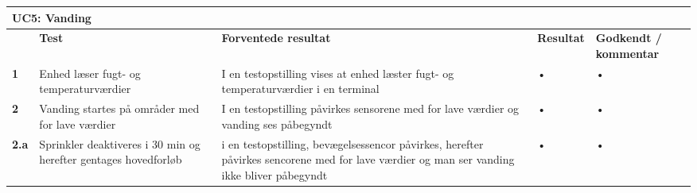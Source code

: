 
\begin{longtable}{|p{5mm}|p{40mm}|p{40mm}|p{20mm}|p{25mm}|}
\hline 
\multicolumn{5}{|l|}{\textbf{UC5: Vanding}} \\ 
\hline 
& \textbf{Test} & \textbf{Forventede resultat} & \textbf{Resultat} & \textbf{Godkendt / kommentar} \\ 
\hline 
\textbf{1}& Enhed læser fugt- og temperaturværdier & I en testopstilling vises at enhed læster fugt- og temperaturværdier i en terminal & • & • \\ 
\hline 
\textbf{2}& Vanding startes på områder med for lave værdier & I en testopstilling påvirkes sensorene med for lave værdier og vanding ses påbegyndt & • & • \\ 
\hline 
\textbf{2.a}& Sprinkler deaktiveres i 30 min og herefter gentages hovedforløb & i en testopstilling, bevægelsessencor påvirkes, herefter påvirkes sencorene med for lave værdier og man ser vanding ikke bliver påbegyndt & • & • \\ 
\hline 
\end{longtable} 
